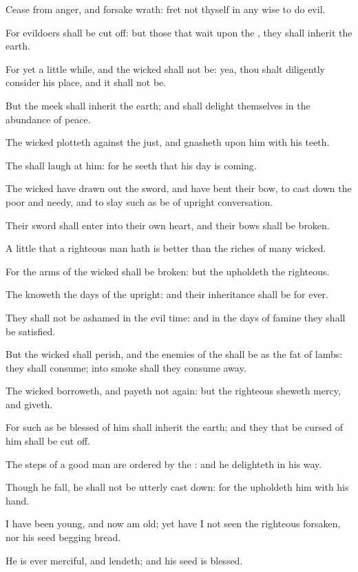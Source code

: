 \verse Cease from anger, and forsake wrath: fret not thyself in any wise to do evil.

\verse For evildoers shall be cut off: but those that wait upon the \LORD, they shall inherit the earth.

\verse For yet a little while, and the wicked shall not be: yea, thou shalt diligently consider his place, and it shall not be.

\verse But the meek shall inherit the earth; and shall delight themselves in the abundance of peace.

\verse The wicked plotteth against the just, and gnasheth upon him with his teeth.

\verse The \LORD shall laugh at him: for he seeth that his day is coming.

\verse The wicked have drawn out the sword, and have bent their bow, to cast down the poor and needy, and to slay such as be of upright conversation.

\verse Their sword shall enter into their own heart, and their bows shall be broken.

\verse A little that a righteous man hath is better than the riches of many wicked.

\verse For the arms of the wicked shall be broken: but the \LORD upholdeth the righteous.

\verse The \LORD knoweth the days of the upright: and their inheritance shall be for ever.

\verse They shall not be ashamed in the evil time: and in the days of famine they shall be satisfied.

\verse But the wicked shall perish, and the enemies of the \LORD shall be as the fat of lambs: they shall consume; into smoke shall they consume away.

\verse The wicked borroweth, and payeth not again: but the righteous sheweth mercy, and giveth.

\verse For such as be blessed of him shall inherit the earth; and they that be cursed of him shall be cut off.

\verse The steps of a good man are ordered by the \LORD: and he delighteth in his way.

\verse Though he fall, he shall not be utterly cast down: for the \LORD upholdeth him with his hand.

\verse I have been young, and now am old; yet have I not seen the righteous forsaken, nor his seed begging bread.

\verse He is ever merciful, and lendeth; and his seed is blessed.

